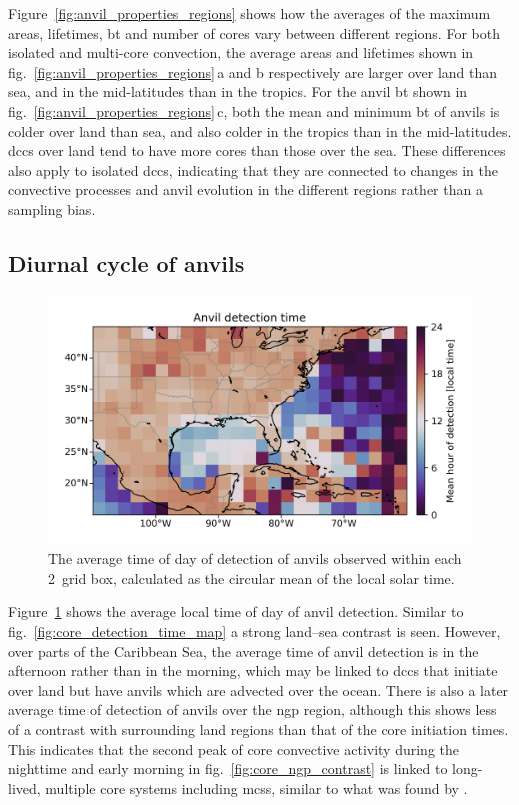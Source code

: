 Figure~\ref{fig:anvil_properties_regions} shows how the averages of the maximum areas, lifetimes, \acrshort{bt} and number of cores vary between different regions.
For both isolated and multi-core convection, the average areas and lifetimes shown in fig.~\ref{fig:anvil_properties_regions}\,a and b respectively are larger over land than sea, and in the mid-latitudes than in the tropics.
For the anvil \acrshort{bt} shown in fig.~\ref{fig:anvil_properties_regions}\,c, both the mean and minimum \acrshort{bt} of anvils is colder over land than sea, and also colder in the tropics than in the mid-latitudes.
\acrshort{dcc}s over land tend to have more cores than those over the sea.
These differences also apply to isolated \acrshort{dcc}s, indicating that they are connected to changes in the convective processes and anvil evolution in the different regions rather than a sampling bias.

\subsection{Diurnal cycle of anvils}

\begin{figure}[tp]
    \centering
    \includegraphics[width=\textwidth]{figures/chapter2_23.png}
    \caption[
    The average time of detection of anvils
    ]{
    The average time of day of detection of anvils observed within each 2\textdegree\ grid box, calculated as the circular mean of the local solar time.
    }
    \label{fig:anvil_detection_time_map}
\end{figure}

Figure~\ref{fig:anvil_detection_time_map} shows the average local time of day of anvil detection.
Similar to fig.~\ref{fig:core_detection_time_map} a strong land--sea contrast is seen.
However, over parts of the Caribbean Sea, the average time of anvil detection is in the afternoon rather than in the morning, which may be linked to \acrshort{dcc}s that initiate over land but have anvils which are advected over the ocean.
There is also a later average time of detection of anvils over the \acrshort{ngp} region, although this shows less of a contrast with surrounding land regions than that of the core initiation times.
This indicates that the second peak of core convective activity during the nighttime and early morning in fig.~\ref{fig:core_ngp_contrast} is linked to long-lived, multiple core systems including \acrshort{mcs}s, similar to what was found by \citet{feng_spatiotemporal_2019}.

